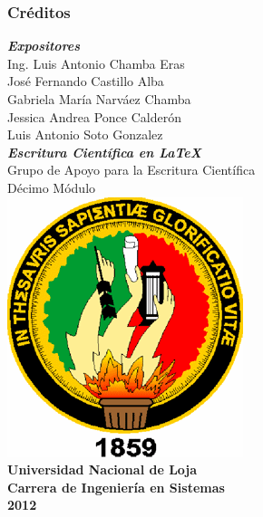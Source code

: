 \documentclass[sans serif,9pt,xcolor=dvipsnames]{beamer}%
\begin{document}
\begin{frame}
\frametitle {Créditos}
	\begin{center}
		\textbf{\textit{Expositores}}\\
			Ing. Luis Antonio Chamba Eras\\
			José Fernando Castillo Alba\\
			Gabriela María Narváez Chamba\\
			Jessica Andrea Ponce Calderón\\
			Luis Antonio Soto  Gonzalez\\
\vspace{0.5 cm}
\textbf{\textit{Escritura Científica en \LaTeX }}\\
Grupo de Apoyo para la Escritura Científica\\
  Décimo Módulo\\
  \vspace{0.3 cm}
\includegraphics[height=0.5 cm]{imagenes/escudoUNL.png} \\
\textbf{Universidad Nacional de Loja\\
Carrera de Ingeniería en Sistemas\\
2012
}
	\end{center}
\end{frame}
\end{document}
